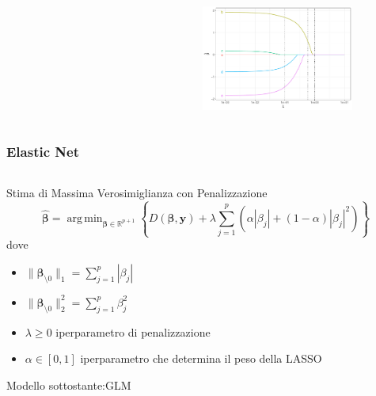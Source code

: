 \documentclass[pdf, aspectratio=169, xcolor=dvipsnames]{beamer}\usepackage[]{graphicx}\usepackage[]{color}
\DeclareMathOperator*{\argmin}{arg\,min}  %
\theoremstyle{definition}
\begin{document}
\begin{frame}
\begin{columns}[c]
\begin{column}{0.55\linewidth}
\begin{figure}
\begin{subfigure}[b]{3cm}
    \end{subfigure}
  \end{figure}
\end{column}
\begin{column}{0.45\linewidth}
  \begin{figure}
    \centering
    \includegraphics[width=5cm]{_bookdown_files/_main_files/figure-latex/lasso-lambda-5.pdf}
  \end{figure}
\end{column}
\end{columns}

\end{frame}

\begin{frame}
\frametitle{Elastic Net}

\fontsize{9pt}{11pt}\selectfont

\begin{columns}
\begin{column}{0.8\linewidth}
  \begin{block}{Stima di Massima Verosimiglianza con Penalizzazione}
    $$
    \hat{\boldsymbol{\beta}} = \argmin_{\boldsymbol{\beta}\in\mathbb{R}^{p+1}}{\left\{
    D(\boldsymbol{\beta}, \boldsymbol{y}) +
    \lambda 
    \sum_{j=1}^p{\left(\alpha |\beta_j| + (1 - \alpha) |\beta_j|^2\right)}
    \right\}}
    $$
    dove
    \begin{itemize}
      \item $\|\boldsymbol{\beta}_{\setminus0}\|_1 = \sum_{j=1}^p{|\beta_j|}$
      \item $\|\boldsymbol{\beta}_{\setminus0}\|_2^2 = \sum_{j=1}^p{\beta_j^2}$
      \item $\lambda\ge0$ iperparametro di penalizzazione
      \item $\alpha \in [0,1]$ iperparametro che determina il peso della LASSO
    \end{itemize}
    
    \vspace{0.2cm}
    
    Modello sottostante:GLM
  \end{block}
\end{column}
\end{columns}

\end{frame}
\end{document}
